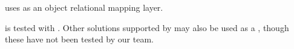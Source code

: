 \app{} uses  as an object relational mapping layer. 


\app{} is tested with .
Other \gddb{} solutions supported by  may also be 
used as a \gddb{}, though these have not been tested by our team. 



